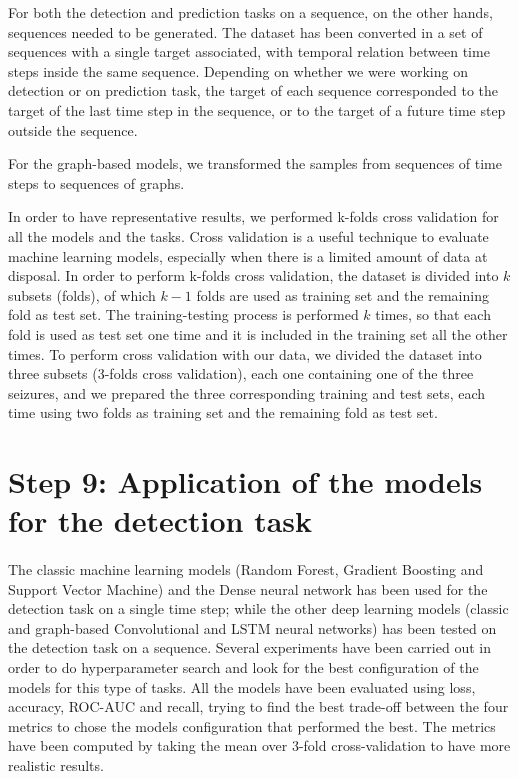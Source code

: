 For both the detection and prediction tasks on a sequence, on the other hands, sequences needed to be generated. The dataset has been converted in a set of sequences with a single target associated, with temporal relation between time steps inside the same sequence. Depending on whether we were working on detection or on prediction task, the target of each sequence corresponded to the target of the last time step in the sequence, or to the target of a future time step outside the sequence.

For the graph-based models, we transformed the samples from sequences of time steps to sequences of graphs.

In order to have representative results, we performed k-folds cross validation for all the models and the tasks. Cross validation is a useful technique to evaluate machine learning models, especially when there is a limited amount of data at disposal. In order to perform k-folds cross validation, the dataset is divided into $k$ subsets (folds), of which $k-1$ folds are used as training set and the remaining fold as test set. The training-testing process is performed $k$ times, so that each fold is used as test set one time and it is included in the training set all the other times. To perform cross validation with our data, we divided the dataset into three subsets (3-folds cross validation), each one containing one of the three seizures, and we prepared the three corresponding training and test sets, each time using two folds as training set and the remaining fold as test set.


\section{Step 9: Application of the models for the detection task} \label{sec: step_models_detection_task}
\paragraph{} The classic machine learning models (Random Forest, Gradient Boosting and Support Vector Machine) and the Dense neural network has been used for the detection task on a single time step; while the other deep learning models (classic and graph-based Convolutional and LSTM neural networks) has been tested on the detection task on a sequence. Several experiments have been carried out in order to do hyperparameter search and look for the best configuration of the models for this type of tasks. All the models have been evaluated using loss, accuracy, ROC-AUC and recall, trying to find the best trade-off between the four metrics to chose the models configuration that performed the best. The metrics have been computed by taking the mean over 3-fold cross-validation to have more realistic results.

